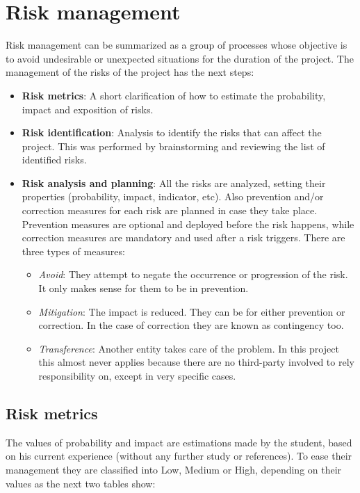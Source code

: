 \section{Risk management}
Risk management can be summarized as a group of processes whose objective is to avoid undesirable or unexpected situations for the duration of the project.
\linej
\linej
The management of the risks of the project has the next steps:
\begin{itemize}
	\item \textbf{Risk metrics}: A short clarification of how to estimate the probability, impact and exposition of risks.
	\item \textbf{Risk identification}: Analysis to identify the risks that can affect the project. This was performed by brainstorming and reviewing the list of identified risks.
	\item \textbf{Risk analysis and planning}: All the risks are analyzed, setting their properties (probability, impact, indicator, etc). Also prevention and/or correction measures for each risk are planned in case they take place. Prevention measures are optional and deployed before the risk happens, while correction measures are mandatory and used after a risk triggers. There are three types of measures:
		\begin{itemize}
			\item \textit{Avoid}: They attempt to negate the occurrence or progression of the risk. It only makes sense for them to be in prevention.
			\item \textit{Mitigation}: The impact is reduced. They can be for either prevention or correction. In the case of correction they are known as contingency too.
			\item \textit{Transference}: Another entity takes care of the problem. In this project this almost never applies because there are no third-party involved to rely responsibility on, except in very specific cases.
		\end{itemize}
\end{itemize}

\subsection{Risk metrics}
The values of probability and impact are estimations made by the student, based on his current experience (without any further study or references).
\linej
To ease their management they are classified into Low, Medium or High, depending on their values as the next two tables show:


